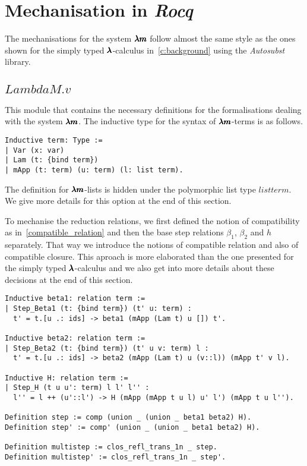
\section{Mechanisation in \textit{Rocq}}

The mechanisations for the system $\pmb{\lambda m}$ follow almost the same style as the ones shown for the simply typed $\pmb{\lambda}$-calculus in~\cref{c:background} using the \textit{Autosubst} library.

\subsection{\lst$LambdaM.v$}

This module that contains the necessary definitions for the formalisations dealing with the system $\pmb{\lambda m}$.
The inductive type for the syntax of $\pmb{\lambda m}$-terms is as follows.
\begin{lstlisting}[language=Coq]
Inductive term: Type :=
| Var (x: var)
| Lam (t: {bind term})
| mApp (t: term) (u: term) (l: list term).
\end{lstlisting}

The definition for $\pmb{\lambda m}$-lists is hidden under the polymorphic list type \lst$list term$.
We give more details for this option at the end of this section.

To mechanise the reduction relations, we first defined the notion of compatibility as in~\cref{compatible_relation} and then the base step relations $\beta_1$, $\beta_2$ and $h$ separately.
That way we introduce the notions of compatible relation and also of compatible closure.
This aproach is more elaborated than the one presented for the simply typed $\pmb{\lambda}$-calculus and we also get into more details about these decisions at the end of this section.

\begin{lstlisting}[language=Coq]
Inductive beta1: relation term :=
| Step_Beta1 (t: {bind term}) (t' u: term) :
  t' = t.[u .: ids] -> beta1 (mApp (Lam t) u []) t'.

Inductive beta2: relation term :=
| Step_Beta2 (t: {bind term}) (t' u v: term) l :
  t' = t.[u .: ids] -> beta2 (mApp (Lam t) u (v::l)) (mApp t' v l).

Inductive H: relation term :=       
| Step_H (t u u': term) l l' l'' :
  l'' = l ++ (u'::l') -> H (mApp (mApp t u l) u' l') (mApp t u l'').

Definition step := comp (union _ (union _ beta1 beta2) H).
Definition step' := comp' (union _ (union _ beta1 beta2) H).

Definition multistep := clos_refl_trans_1n _ step.
Definition multistep' := clos_refl_trans_1n _ step'.
\end{lstlisting}

